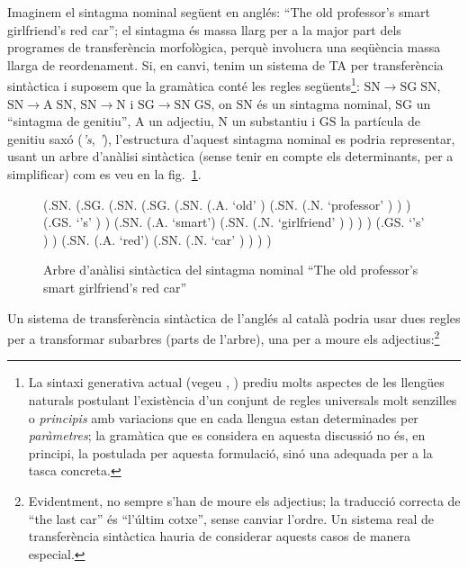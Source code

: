 Imaginem el sintagma nominal següent en anglés: ``The old professor's
smart girlfriend's red car''; el sintagma és massa llarg per a la
major part dels programes de transferència morfològica, perquè
involucra una seqüència massa llarga de reordenament.  Si, en canvi,
tenim un sistema de TA per transferència sintàctica i suposem que la
gramàtica conté les regles següents\footnote{La sintaxi generativa
  actual (vegeu \citealt{chomsky96b}, \cite{ramos92}) prediu molts
  aspectes de les llengües naturals postulant l'existència d'un
  conjunt de regles universals molt senzilles o \emph{principis} amb
  variacions que en cada llengua estan determinades per
  \emph{paràmetres}; la gramàtica que es considera en aquesta
  discussió no és, en principi, la postulada per aquesta formulació,
  sinó una adequada per a la tasca concreta.}: $\mathrm{SN}\rightarrow
\mathrm{SG}\;\mathrm{SN}$, $\mathrm{SN} \rightarrow
\mathrm{A}\;\mathrm{SN}$, $\mathrm{SN}\rightarrow \mathrm{N}$ i
$\mathrm{SG}\rightarrow \mathrm{SN}\;\mathrm{GS}$, on $\mathrm{SN}$ és
un sintagma nominal, $\mathrm{SG}$ un ``sintagma de genitiu'',
$\mathrm{A}$ un adjectiu, $\mathrm{N}$ un substantiu i $\mathrm{GS}$
la partícula de genitiu saxó (\emph{'s}, \emph{'}), l'estructura
d'aquest sintagma nominal es podria representar, usant un arbre
d'anàlisi sintàctica (sense tenir en compte els determinants, per a
simplificar) com es veu en la fig.~\ref{fg:arbre1}.
\begin{figure}
\begin{center}
\begin{parsetree}
(.SN. (.SG. (.SN. (.SG. 
                   (.SN. (.A. `old' ) (.SN. (.N. `professor' ) )
                   )
                   (.GS. `{'s}' ) 
                  )
                  (.SN. (.A. `smart') (.SN. (.N. `girlfriend' ) ) )
            )
            (.GS. `{'s}' )
     )
     (.SN. (.A. `red') (.SN. (.N. `car' ) ) ) 
)                  
\end{parsetree}
\end{center}
\caption{Arbre d'anàlisi sintàctica del sintagma nominal ``The old
  professor's smart girlfriend's red car''}
\label{fg:arbre1}
\end{figure}  
Un sistema de transferència sintàctica de l'anglés al català podria
usar dues regles per a transformar subarbres (parts de l'arbre), una
per a moure els adjectius:\footnote{Evidentment, no sempre s'han de
  moure els adjectius; la traducció correcta de ``the last car'' és
  ``l'últim cotxe'', sense canviar l'ordre. Un sistema real de
  transferència sintàctica hauria de considerar aquests casos de
  manera especial.}
